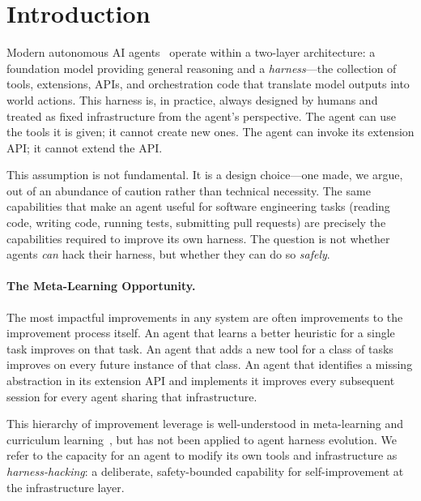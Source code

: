 \section{Introduction}

\label{sec:intro}

Modern autonomous AI agents~\cite{openai2023gpt4, anthropic2024claude,
yang2024sweagent} operate within a two-layer architecture: a foundation model
providing general reasoning and a \emph{harness}---the collection of tools,
extensions, APIs, and orchestration code that translate model outputs into world
actions. This harness is, in practice, always designed by humans and treated as
fixed infrastructure from the agent's perspective. The agent can use the tools
it is given; it cannot create new ones. The agent can invoke its extension API;
it cannot extend the API.

This assumption is not fundamental. It is a design choice---one made, we argue,
out of an abundance of caution rather than technical necessity. The same
capabilities that make an agent useful for software engineering tasks (reading
code, writing code, running tests, submitting pull requests) are precisely the
capabilities required to improve its own harness. The question is not whether
agents \emph{can} hack their harness, but whether they can do so \emph{safely}.

\paragraph{The Meta-Learning Opportunity.}
The most impactful improvements in any system are often improvements to the
improvement process itself. An agent that learns a better heuristic for a single
task improves on that task. An agent that adds a new tool for a class of tasks
improves on every future instance of that class. An agent that identifies a
missing abstraction in its extension API and implements it improves every
subsequent session for every agent sharing that infrastructure.

This hierarchy of improvement leverage is well-understood in meta-learning and
curriculum learning~\cite{schmidhuber1987evolutionary,
thrun1998learning}, but has not been applied to agent harness evolution. We
refer to the capacity for an agent to modify its own tools and infrastructure as
\emph{harness-hacking}: a deliberate, safety-bounded capability for
self-improvement at the infrastructure layer.

